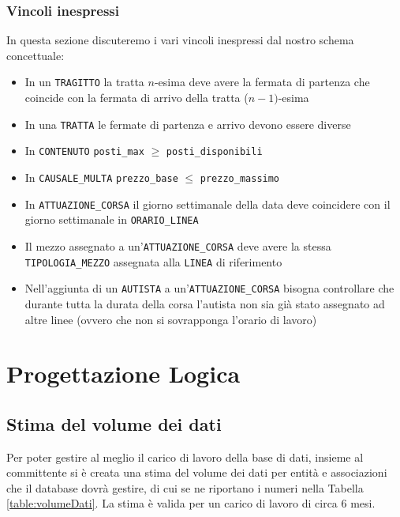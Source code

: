 \documentclass[12pt,a4paper]{report}
\begin{document}
\subsection{Vincoli inespressi}
In questa sezione discuteremo i vari vincoli inespressi dal nostro schema concettuale:
\begin{itemize}
  \item In un \texttt{TRAGITTO} la tratta $n$-esima deve avere la fermata di partenza che coincide con la fermata di arrivo della tratta ($n-1)$-esima
  \item In una \texttt{TRATTA} le fermate di partenza e arrivo devono essere diverse
  \item In \texttt{CONTENUTO} \texttt{posti\_max} $ \geq $ \texttt{posti\_disponibili}
  \item In \texttt{CAUSALE\_MULTA} \texttt{prezzo\_base} $ \leq $ \texttt{prezzo\_massimo}
  \item In \texttt{ATTUAZIONE\_CORSA} il giorno settimanale della data deve coincidere con il giorno settimanale in \texttt{ORARIO\_LINEA}
  \item Il mezzo assegnato a un'\texttt{ATTUAZIONE\_CORSA} deve avere la stessa \texttt{TIPOLOGIA\_MEZZO} assegnata alla \texttt{LINEA} di riferimento
  \item Nell'aggiunta di un \texttt{AUTISTA} a un'\texttt{ATTUAZIONE\_CORSA} bisogna controllare che durante tutta la durata della corsa l'autista non sia già stato assegnato ad altre linee (ovvero che non si sovrapponga l'orario di lavoro)
\end{itemize}

\chapter{Progettazione Logica}
\section{Stima del volume dei dati}
Per poter gestire al meglio il carico di lavoro della base di dati, insieme al committente si è creata una stima del volume dei dati per entità e associazioni che il database dovrà gestire, di cui se ne riportano i numeri nella Tabella \ref{table:volumeDati}.
La stima è valida per un carico di lavoro di circa 6 mesi.
\end{document}
